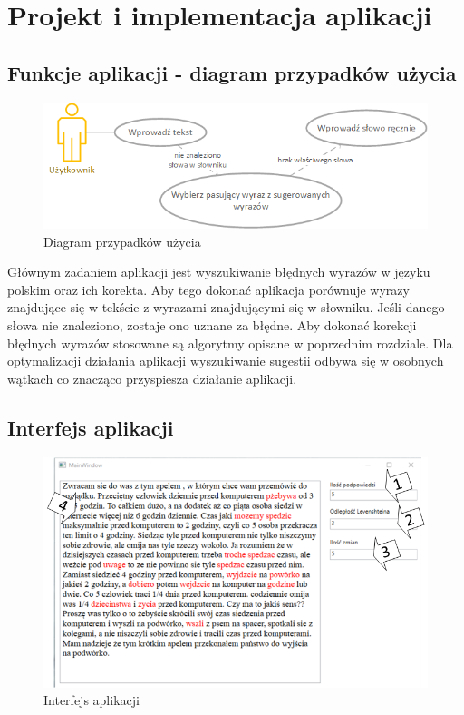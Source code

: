 \chapter{Projekt i implementacja aplikacji}

\section{Funkcje aplikacji - diagram przypadków użycia}

\begin{figure} [H]
	\centering
	\includegraphics[width=1\linewidth]{rozdzial03/diagram.png}
	\caption{Diagram przypadków użycia}
	\label{fig:diagUzycia}
\end{figure}

Głównym zadaniem aplikacji jest wyszukiwanie błędnych wyrazów w języku polskim oraz ich korekta. Aby tego dokonać aplikacja porównuje wyrazy znajdujące się w tekście z wyrazami znajdującymi się w słowniku. Jeśli danego słowa nie znaleziono, zostaje ono uznane za błędne. Aby dokonać korekcji błędnych wyrazów stosowane są algorytmy opisane w poprzednim rozdziale. Dla optymalizacji działania aplikacji wyszukiwanie sugestii odbywa się w osobnych wątkach co znacząco przyspiesza działanie aplikacji. 


\section{Interfejs aplikacji}

\begin{figure} [H]
	\centering
	\includegraphics[width=1\linewidth]{rozdzial03/screen1_1.png}
	\caption{Interfejs aplikacji}
	\label{fig:interfejs}
\end{figure}

